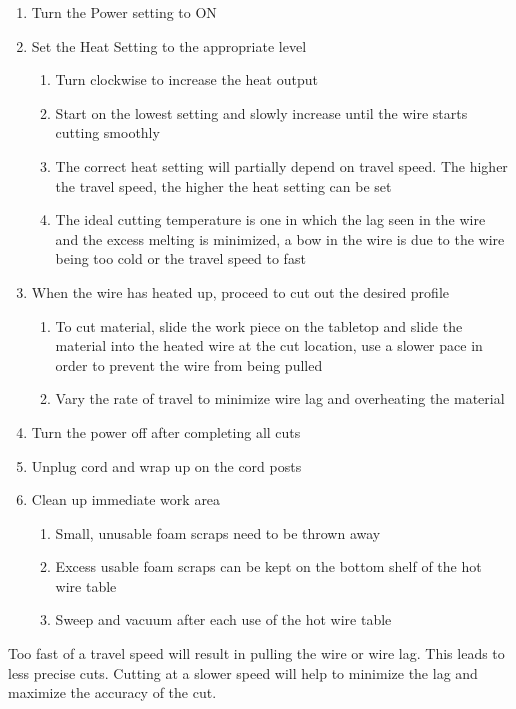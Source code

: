 \begin{enumerate}
\item Turn the Power setting to ON
\item Set the Heat Setting to the appropriate level
\begin{enumerate}
\item Turn clockwise to increase the heat output
\item Start on the lowest setting and slowly increase until the wire starts cutting smoothly
\item The correct heat setting will partially depend on travel speed. The higher the travel speed, the higher the heat setting can be set
\item The ideal cutting temperature is one in which the lag seen in the wire and the excess melting is minimized, a bow in the wire is due to the wire being too cold or the travel speed to fast
\end{enumerate}
\item When the wire has heated up, proceed to cut out the desired profile
\begin{enumerate}
\item To cut material, slide the work piece on the tabletop and slide the material into the heated wire at the cut location, use a slower pace in order to prevent the wire from being pulled
\item Vary the rate of travel to minimize wire lag and overheating the material
\end{enumerate}
\item Turn the power off after completing all cuts
\item Unplug cord and wrap up on the cord posts
\item Clean up immediate work area
\begin{enumerate}
\item Small, unusable foam scraps need to be thrown away
\item Excess usable foam scraps can be kept on the bottom shelf of the hot wire table
\item Sweep and vacuum after each use of the hot wire table
\end{enumerate}
\end{enumerate}

Too fast of a travel speed will result in pulling the wire or wire lag. This leads to less precise cuts. Cutting at a slower speed will help to minimize the lag and maximize the accuracy of the cut.

